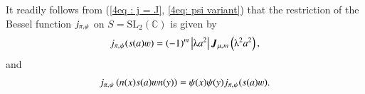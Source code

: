 \documentclass{amsproc}
\newcommand{\BC}{{\mathbb {C}}} \newcommand{\BD}{{\mathbb {D}}}
\newcommand{\SL}{{\mathrm {SL}}} \newcommand{\PSL}{{\mathrm {PSL}}}
\def\lp {\left (}
\def\rp {\right )}
\def\bfJ {\boldsymbol J}
\def\shskip{\hskip 0.5 pt}
\theoremstyle{plain}
\numberwithin{equation}{section}
\begin{document}
	
	
	
	
	
	  It readily follows from (\ref{4eq : j = J}, \ref{4eq: psi variant}) that the restriction of the Bessel function $j_{\pi, \shskip \psi}$ on   $S = \SL_2 (\BC)$  is given by
	\begin{align}\label{4eq: j = J, SL}
	j_{\pi, \shskip \psi} (  s (a) \varw ) =  (-1)^m \left|\lambdaup   a^2 \right|  \bfJ_{ \mu,\shskip   m} \lp   \lambdaup^2   a^2 \rp,
	\end{align}
	and
	\begin{align}\label{4eq: psi variant, SL}
	j_{\pi, \shskip \psi} \lp n(x)   s (a) \varw n(y) \rp = \psi (x) \psi (y)  j_{\pi, \shskip \psi} (  s (a) \varw ).
	\end{align}
	
\end{document}
